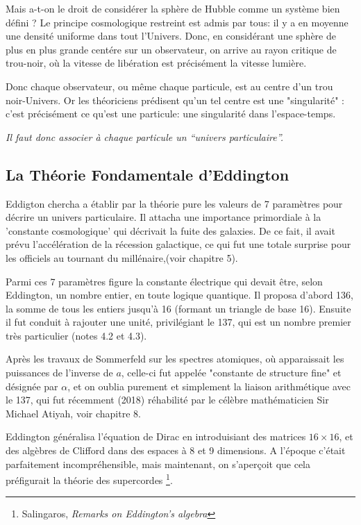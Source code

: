 \documentclass[a4paper,12pt]{article}
\begin{document}
Mais a-t-on le droit de considérer la sphère de Hubble comme un système bien défini ? Le principe cosmologique restreint est admis par tous: il y a en moyenne une densité uniforme dans tout l'Univers. Donc, en considérant une sphère de plus en plus grande centére sur un observateur, on arrive au rayon critique de trou-noir, où la vitesse de libération est précisément la vitesse lumière. 

Donc chaque observateur, ou même chaque particule, est au centre d'un trou noir-Univers. Or les théoriciens prédisent qu'un tel centre est une "singularité" : c'est précisément ce qu'est une particule: une singularité dans l'espace-temps.

\textit{Il faut donc associer à chaque particule un ``univers particulaire''.}

\subsection{La Théorie Fondamentale d'Eddington}

Eddigton chercha a établir par la théorie pure les valeurs de 7 paramètres pour décrire un univers particulaire. Il attacha une importance primordiale à la 'constante cosmologique' qui décrivait la fuite des galaxies. De ce fait, il avait prévu l'accélération de la récession galactique, ce qui fut une totale surprise pour les officiels au tournant du millénaire,(voir chapitre 5). 

Parmi ces 7 paramètres figure la constante électrique qui devait être, selon Eddington, un nombre entier, en toute logique quantique. Il proposa d'abord 136, la somme de tous les entiers jusqu'à 16 (formant un triangle de base 16). Ensuite il fut conduit à rajouter une unité, privilégiant le 137, qui est un nombre premier très particulier (notes 4.2 et 4.3).

Après les travaux de Sommerfeld sur les spectres atomiques, où apparaissait les puissances de l'inverse de $a$, celle-ci fut appelée "constante de structure fine" et désignée par $\alpha$, et on oublia purement et simplement la liaison arithmétique avec le 137, qui fut récemment (2018) réhabilité par le célèbre mathématicien Sir Michael Atiyah, voir chapitre 8.

Eddington généralisa l'équation de Dirac en introduisiant des matrices $16 \times 16$, et des algèbres de Clifford dans des espaces à 8 et 9 dimensions. A l'époque c'était parfaitement incompréhensible, mais maintenant, on s'aperçoit que cela préfigurait la théorie des supercordes \footnote{Salingaros, \textit{Remarks on Eddington's algebra}}.
\end{document}
